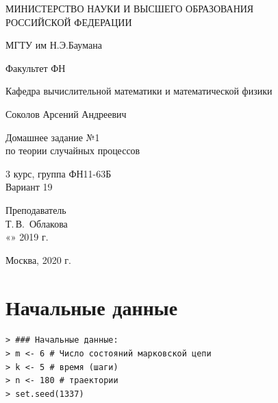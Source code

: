 \documentclass[14pt,a4paper]{scrartcl}
\begin{document}
	\begin{titlepage}
	\begin{center}
		\large
		МИНИСТЕРСТВО НАУКИ И ВЫСШЕГО ОБРАЗОВАНИЯ\\ РОССИЙСКОЙ ФЕДЕРАЦИИ
		
		\vspace{0.5cm}
		
		МГТУ им Н.Э.Баумана
		\vspace{0.25cm}
		
		Факультет ФН
		
		Кафедра вычислительной математики и математической физики
		\vfill
		
		
		Соколов Арсений Андреевич\\
		\vfill
		
		
		{\LARGE Домашнее задание №1 \\ по теории случайных процессов\\[2mm]
		}
		\bigskip
		
		3 курс, группа ФН11-63Б\\
		Вариант 19
	\end{center}
	\vfill
	
	\newlength{\ML}
	\hfill\begin{minipage}{0.4\textwidth}
		Преподаватель\\
		\underline{\hspace{3cm}} Т.\,В.~Облакова\\
		«\underline{\hspace{0.7cm}}» \underline{\hspace{1.71cm}} 2019 г.
	\end{minipage}%
	\bigskip
	
	
	\vfill
	
	\begin{center}
		Москва, 2020 г.
	\end{center}
\end{titlepage}

\section*{Начальные данные}

\begin{verbatim}
> ### Начальные данные:
> m <- 6 # Число состояний марковской цепи
> k <- 5 # время (шаги)
> n <- 180 # траектории
> set.seed(1337)
\end{verbatim}
\end{document}
